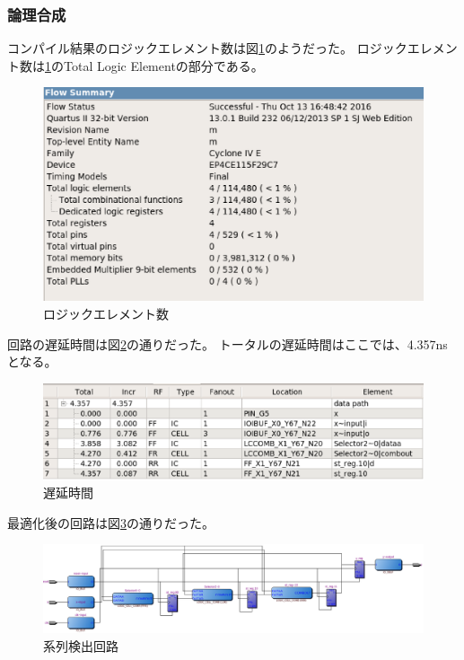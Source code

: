 \documentclass[uplatex]{jsarticle}
\begin{document}
\subsubsection{論理合成}


コンパイル結果のロジックエレメント数は図\ref{fig:24}のようだった。
ロジックエレメント数は\ref{fig:24}のTotal Logic Elementの部分である。  

\begin{figure}[htb]
  \begin{center}
    \includegraphics[width=13cm]{images/fig24.eps}
    \caption{ロジックエレメント数}
    \label{fig:24}
  \end{center}
\end{figure}

回路の遅延時間は図\ref{fig:25}の通りだった。
トータルの遅延時間はここでは、4.357nsとなる。

\begin{figure}[htb]
  \begin{center}
    \includegraphics[width=13cm]{images/fig25.eps}
    \caption{遅延時間}
    \label{fig:25}
  \end{center}
\end{figure}

最適化後の回路は図\ref{fig:26}の通りだった。

\begin{figure}[htb]
  \begin{center}
    \includegraphics[width=13cm]{images/fig26.eps}
    \caption{系列検出回路}
    \label{fig:26}
  \end{center}
\end{figure}
\end{document}
